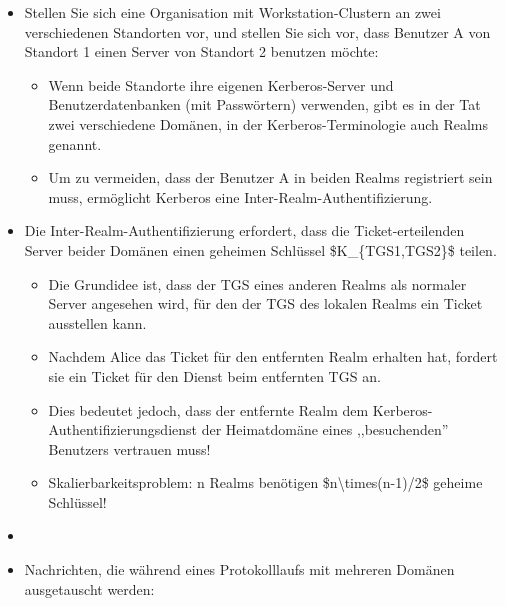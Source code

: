 \documentclass[a4paper]{article}
\begin{document}
\begin{multicols}{3}
    \begin{itemize}
        \item
              Stellen Sie sich eine Organisation mit Workstation-Clustern an zwei
              verschiedenen Standorten vor, und stellen Sie sich vor, dass Benutzer
              A von Standort 1 einen Server von Standort 2 benutzen möchte:

              \begin{itemize}
                  \item
                        Wenn beide Standorte ihre eigenen Kerberos-Server und
                        Benutzerdatenbanken (mit Passwörtern) verwenden, gibt es in der Tat
                        zwei verschiedene Domänen, in der Kerberos-Terminologie auch Realms
                        genannt.
                  \item
                        Um zu vermeiden, dass der Benutzer A in beiden Realms registriert
                        sein muss, ermöglicht Kerberos eine Inter-Realm-Authentifizierung.
              \end{itemize}
        \item
              Die Inter-Realm-Authentifizierung erfordert, dass die
              Ticket-erteilenden Server beider Domänen einen geheimen Schlüssel
              \$K\_\{TGS1,TGS2\}\$ teilen.

              \begin{itemize}
                  \item
                        Die Grundidee ist, dass der TGS eines anderen Realms als normaler
                        Server angesehen wird, für den der TGS des lokalen Realms ein Ticket
                        ausstellen kann.
                  \item
                        Nachdem Alice das Ticket für den entfernten Realm erhalten hat,
                        fordert sie ein Ticket für den Dienst beim entfernten TGS an.
                  \item
                        Dies bedeutet jedoch, dass der entfernte Realm dem
                        Kerberos-Authentifizierungsdienst der Heimatdomäne eines
                        ,,besuchenden'' Benutzers vertrauen muss!
                  \item
                        Skalierbarkeitsproblem: n Realms benötigen
                        \$n\textbackslash times(n-1)/2\$ geheime Schlüssel!
              \end{itemize}
        \item
        \item
              Nachrichten, die während eines Protokolllaufs mit mehreren Domänen
              ausgetauscht werden:


\end{itemize}
\end{multicols}
\end{document}
